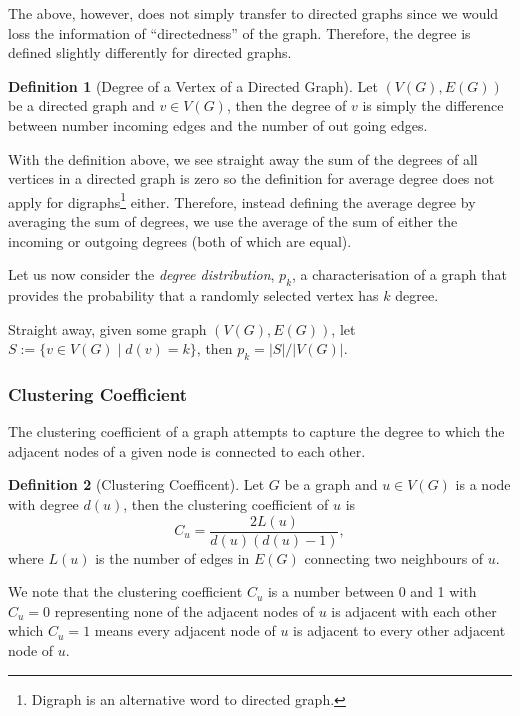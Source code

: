 \documentclass[
]{article}
\theoremstyle{definition}
\newtheorem{definition}{Definition}[section]
\begin{document}
The above, however, does not simply transfer to directed graphs since we
would loss the information of ``directedness'' of the graph. Therefore,
the degree is defined slightly differently for directed graphs.

\begin{definition}[Degree of a Vertex of a Directed Graph]
  Let \((V(G), E(G))\) be a directed graph and \(v \in V(G)\), then the degree 
  of \(v\) is simply the difference between number incoming edges and the number 
  of out going edges. 
\end{definition}

With the definition above, we see straight away the sum of the degrees
of all vertices in a directed graph is zero so the definition for
average degree does not apply for
digraphs\footnote{Digraph is an alternative word to directed graph.}
either. Therefore, instead defining the average degree by averaging the
sum of degrees, we use the average of the sum of either the incoming or
outgoing degrees (both of which are equal).

Let us now consider the \emph{degree distribution}, \(p_k\), a
characterisation of a graph that provides the probability that a
randomly selected vertex has \(k\) degree.

Straight away, given some graph \((V(G), E(G))\), let
\(S := \{ v \in V(G) \mid d(v) = k \}\), then
\(p_k = \left| S \right| / \left| V(G) \right|\).

\hypertarget{clustering-coefficient}{%
\subsubsection{Clustering Coefficient}\label{clustering-coefficient}}

The clustering coefficient of a graph attempts to capture the degree to
which the adjacent nodes of a given node is connected to each other.

\begin{definition}[Clustering Coefficent]
  Let \(G\) be a graph and \(u \in V(G)\) is a node with degree \(d(u)\), then 
  the clustering coefficient of \(u\) is 
  \[
    C_u = \frac{2 L(u)}{d(u)(d(u) - 1)},
  \]
  where \(L(u)\) is the number of edges in \(E(G)\) connecting two neighbours of 
  \(u\).
\end{definition}

We note that the clustering coefficient \(C_u\) is a number between 0
and 1 with \(C_u = 0\) representing none of the adjacent nodes of \(u\)
is adjacent with each other which \(C_u = 1\) means every adjacent node
of \(u\) is adjacent to every other adjacent node of \(u\).
\end{document}
